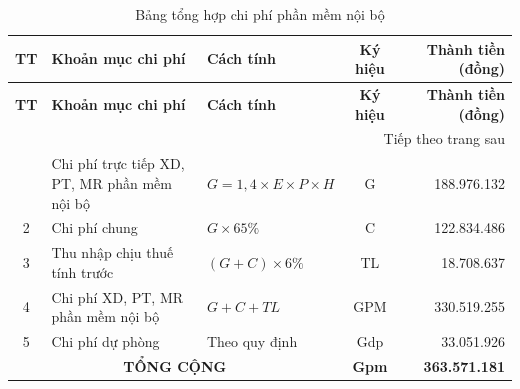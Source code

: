 \begin{longtable}{|c|p{4.5cm}|p{3.5cm}|c|r|}
\caption{Bảng tổng hợp chi phí phần mềm nội bộ \label{tab:tong_hop_chi_phi}} \\
\hline
\textbf{TT} & \textbf{Khoản mục chi phí} & \textbf{Cách tính} & \textbf{Ký hiệu} & \textbf{Thành tiền (đồng)} \\ \hline
\endfirsthead
\hline
\textbf{TT} & \textbf{Khoản mục chi phí} & \textbf{Cách tính} & \textbf{Ký hiệu} & \textbf{Thành tiền (đồng)} \\ \hline
\endhead
\hline
\multicolumn{5}{r}{{Tiếp theo trang sau}} \\
\endfoot
\hline
\endlastfoot
1 & Chi phí trực tiếp XD, PT, MR phần mềm nội bộ & $G=1,4\times E\times P\times H$ & G & 188.976.132 \\ \hline
2 & Chi phí chung & $G\times 65\%$ & C & 122.834.486 \\ \hline
3 & Thu nhập chịu thuế tính trước & $(G+C)\times 6\%$ & TL & 18.708.637 \\ \hline
4 & Chi phí XD, PT, MR phần mềm nội bộ & $G+C+TL$ & GPM & 330.519.255 \\ \hline
5 & Chi phí dự phòng & Theo quy định & Gdp & 33.051.926 \\ \hline
\multicolumn{3}{|c|}{\textbf{TỔNG CỘNG}} & \textbf{Gpm} & \textbf{363.571.181} \\ \hline
\end{longtable}